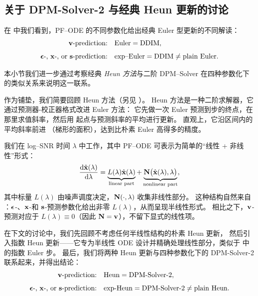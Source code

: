 





\subsection{关于 DPM-Solver-2 与经典 Heun 更新的讨论}\label{subsec:dpm-heun}

在  中我们看到，PF--ODE 的不同参数化给出经典 Euler 型更新的不同解读：
\begin{align*}
\text{${\mathbf{v}}$-prediction:} 
&\quad \text{Euler} = \text{DDIM}, \\[4pt]
\text{${\bm{\epsilon}}$-, ${\mathbf{x}}$-, or ${\mathbf{s}}$-prediction:} 
&\quad \text{exp--Euler} = \text{DDIM} \neq \text{plain Euler}.
\end{align*}

本小节我们进一步通过考察经典 \emph{Heun 方法}与二阶 DPM--Solver 在四种参数化下的类似关系来说明这一联系。


作为铺垫，我们简要回顾 Heun 方法（另见 ）。
Heun 方法是一种二阶求解器，它通过预测器-校正器格式改进 Euler 方法：
它先做一次 Euler 预测到步的终点，在那里求值斜率，然后用
起点与预测斜率的平均进行更新。
直观上，它沿区间内的平均斜率前进
（梯形的面积），达到比朴素 Euler 高得多的精度。

我们在 log--SNR 时间 $\lambda$ 中工作，其中 PF--ODE 可表示为简单的“线性 + 非线性”形式：
\[
\frac{\mathop{}\!\mathrm{d} \hat{{\mathbf{x}}}(\lambda)}{\mathop{}\!\mathrm{d} \lambda}
= \underbrace{L(\lambda)\hat{{\mathbf{x}}}(\lambda)}_{\text{linear part}} + \underbrace{{\mathbf{N}}\big(\hat{{\mathbf{x}}}(\lambda),\lambda\big)}_{\text{nonlinear part}},
\]
其中标量 $L(\lambda)$ 由噪声调度决定，${\mathbf{N}}(\cdot,\lambda)$ 收集非线性部分。
这种结构自然来自 ：${\bm{\epsilon}}$-、${\mathbf{x}}$-和 ${\mathbf{s}}$-预测参数化给出非零 $L(\lambda)$，从而呈现半线性形式。
相比之下，${\mathbf{v}}$-预测对应于 $L(\lambda)\equiv 0$（因此 ${\mathbf{N}}={\mathbf{v}}$），不留下显式的线性项。


在下文的讨论中，我们先回顾不考虑任何半线性结构的朴素 Heun 更新，
然后引入指数 Heun 更新——它专为半线性 ODE 设计并精确处理线性部分，类似于  中的指数 Euler 步。
最后，我们将两种 Heun 更新与四种参数化下的 DPM-Solver-2 联系起来，并得出结论：
\begin{align*}
\text{${\mathbf{v}}$-prediction:} 
&\quad \text{Heun} = \text{DPM-Solver-2}, \\[4pt]
\text{${\bm{\epsilon}}$-, ${\mathbf{x}}$-, or ${\mathbf{s}}$-prediction:} 
&\quad \text{exp-Heun} = \text{DPM-Solver-2} \neq \text{plain Heun}.
\end{align*}

